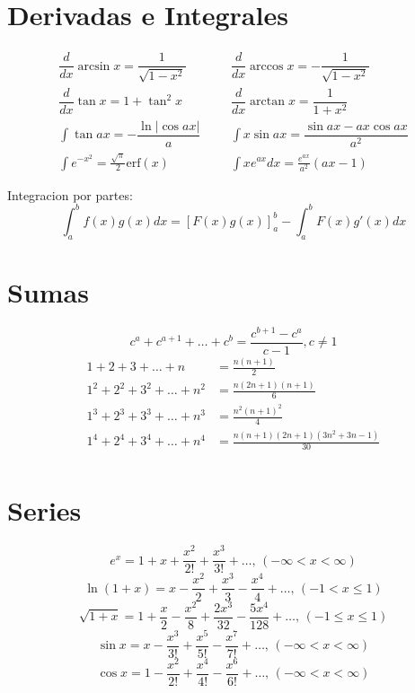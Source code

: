 \section{Derivadas e Integrales}
\begin{align*}
	\dfrac{d}{dx}\arcsin x = \dfrac{1}{\sqrt{1-x^2}} &&& \dfrac{d}{dx}\arccos x = -\dfrac{1}{\sqrt{1-x^2}} \\
	\dfrac{d}{dx}\tan x = 1+\tan^2 x &&& \dfrac{d}{dx}\arctan x = \dfrac{1}{1+x^2} \\
	\int\tan ax = -\dfrac{\ln|\cos ax|}{a} &&& \int x\sin ax = \dfrac{\sin ax-ax \cos ax}{a^2} \\
	\int e^{-x^2} = \frac{\sqrt \pi}{2} \text{erf}(x) &&& \int xe^{ax}dx = \frac{e^{ax}}{a^2}(ax-1)
\end{align*}

Integracion por partes:
\[\int_a^bf(x)g(x)dx = [F(x)g(x)]_a^b-\int_a^bF(x)g'(x)dx\]

\section{Sumas}
\[ c^a + c^{a+1} + \dots + c^{b} = \frac{c^{b+1} - c^a}{c-1}, c \neq 1 \]
\begin{align*}
	1 + 2 + 3 + \dots + n &= \frac{n(n+1)}{2} \\
	1^2 + 2^2 + 3^2 + \dots + n^2 &= \frac{n(2n+1)(n+1)}{6} \\
	1^3 + 2^3 + 3^3 + \dots + n^3 &= \frac{n^2(n+1)^2}{4} \\
	1^4 + 2^4 + 3^4 + \dots + n^4 &= \frac{n(n+1)(2n+1)(3n^2 + 3n - 1)}{30} \\
\end{align*}

\section{Series}
$$e^x = 1+x+\frac{x^2}{2!}+\frac{x^3}{3!}+\dots,\,(-\infty<x<\infty)$$
$$\ln(1+x) = x-\frac{x^2}{2}+\frac{x^3}{3}-\frac{x^4}{4}+\dots,\,(-1<x\leq1)$$
$$\sqrt{1+x} = 1+\frac{x}{2}-\frac{x^2}{8}+\frac{2x^3}{32}-\frac{5x^4}{128}+\dots,\,(-1\leq x\leq1)$$
$$\sin x = x-\frac{x^3}{3!}+\frac{x^5}{5!}-\frac{x^7}{7!}+\dots,\,(-\infty<x<\infty)$$
$$\cos x = 1-\frac{x^2}{2!}+\frac{x^4}{4!}-\frac{x^6}{6!}+\dots,\,(-\infty<x<\infty)$$

